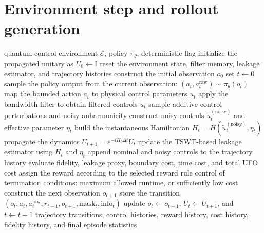 \section{Environment step and rollout generation}
\label{app:env_rollout}


\begin{algorithm}[H]
\caption{Quantum-control environment rollout used for policy interaction and data collection}
\label{alg:env_rollout_appendix}
\begin{algorithmic}[1]
\Require quantum-control environment $\mathcal{E}$, policy $\pi_\theta$, deterministic flag
\State initialize the propagated unitary as $U_0 \leftarrow \mathbb{I}$
\State reset the environment state, filter memory, leakage estimator, and trajectory histories
\State construct the initial observation $o_0$
\State set $t \leftarrow 0$
    \State sample the policy output from the current observation:
    \(
    (a_t, a_t^{\mathrm{raw}}) \sim \pi_\theta(o_t)
    \)
    \State map the bounded action $a_t$ to physical control parameters $u_t$
    \State apply the bandwidth filter to obtain filtered controls $\tilde u_t$
        \State sample additive control perturbations and noisy anharmonicity
        \State construct noisy controls $\tilde u_t^{(\mathrm{noisy})}$ and effective parameter $\eta_t$
    \EndIf
    \State build the instantaneous Hamiltonian
    \(
    H_t = H\!\left(\tilde u_t^{(\mathrm{noisy})}, \eta_t\right)
    \)
    \State propagate the dynamics
    \(
    U_{t+1} = e^{-i H_t \Delta t} U_t
    \)
    \State update the TSWT-based leakage estimator using $H_t$ and $\eta_t$
    \State append nominal and noisy controls to the trajectory history
    \State evaluate fidelity, leakage proxy, boundary cost, time cost, and total UFO cost
    \State assign the reward according to the selected reward rule
    \State control of termination conditions: maximum allowed runtime, or sufficiently low cost
    \State construct the next observation $o_{t+1}$
    \State store the transition
    \(
    (o_t, a_t, a_t^{\mathrm{raw}}, r_{t+1}, o_{t+1}, \mathrm{mask}_t, \mathrm{info}_t)
    \)
    \State update $o_t \leftarrow o_{t+1}$, $U_t \leftarrow U_{t+1}$, and $t \leftarrow t+1$
\EndWhile
\State \Return trajectory transitions, control histories, reward history, cost history, fidelity history, and final episode statistics
\end{algorithmic}
\end{algorithm}

